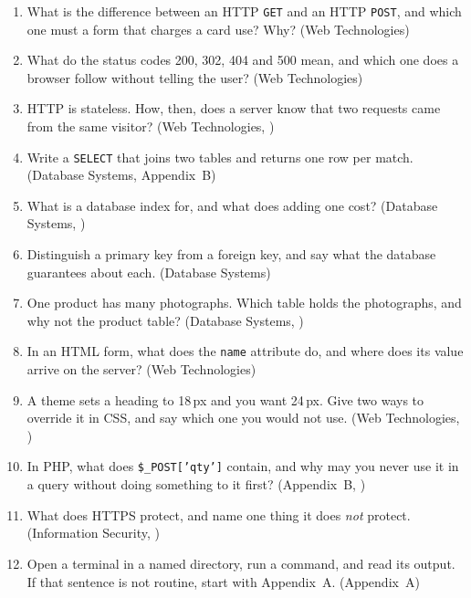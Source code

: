 \begin{enumerate}[leftmargin=2.4em, itemsep=4pt, topsep=4pt]
  \item What is the difference between an HTTP \texttt{GET} and an HTTP
        \texttt{POST}, and which one must a form that charges a card use? Why?
        \hfill{\scriptsize\color{neutral}(Web Technologies)}
  \item What do the status codes 200, 302, 404 and 500 mean, and which one does
        a browser follow without telling the user?
        \hfill{\scriptsize\color{neutral}(Web Technologies)}
  \item HTTP is stateless. How, then, does a server know that two requests came
        from the same visitor?
        \hfill{\scriptsize\color{neutral}(Web Technologies, )}
  \item Write a \texttt{SELECT} that joins two tables and returns one row per
        match. \hfill{\scriptsize\color{neutral}(Database Systems, Appendix~B)}
  \item What is a database index for, and what does adding one cost?
        \hfill{\scriptsize\color{neutral}(Database Systems, )}
  \item Distinguish a primary key from a foreign key, and say what the database
        guarantees about each.
        \hfill{\scriptsize\color{neutral}(Database Systems)}
  \item One product has many photographs. Which table holds the photographs, and
        why not the product table?
        \hfill{\scriptsize\color{neutral}(Database Systems, )}
  \item In an HTML form, what does the \texttt{name} attribute do, and where
        does its value arrive on the server?
        \hfill{\scriptsize\color{neutral}(Web Technologies)}
  \item A theme sets a heading to 18\,px and you want 24\,px. Give two ways to
        override it in CSS, and say which one you would not use.
        \hfill{\scriptsize\color{neutral}(Web Technologies, )}
  \item In PHP, what does \texttt{\$\_POST['qty']} contain, and why may you
        never use it in a query without doing something to it first?
        \hfill{\scriptsize\color{neutral}(Appendix~B, )}
  \item What does HTTPS protect, and name one thing it does \emph{not} protect.
        \hfill{\scriptsize\color{neutral}(Information Security, )}
  \item Open a terminal in a named directory, run a command, and read its
        output. If that sentence is not routine, start with Appendix~A.
        \hfill{\scriptsize\color{neutral}(Appendix~A)}
\end{enumerate}

